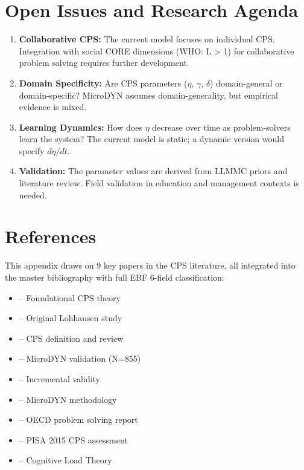 \section{Open Issues and Research Agenda}
\label{sec:cps-open}

\begin{enumerate}
\item \textbf{Collaborative CPS:} The current model focuses on individual CPS. Integration with social CORE dimensions (WHO: L > 1) for collaborative problem solving requires further development.

\item \textbf{Domain Specificity:} Are CPS parameters ($\eta$, $\gamma$, $\delta$) domain-general or domain-specific? MicroDYN assumes domain-generality, but empirical evidence is mixed.

\item \textbf{Learning Dynamics:} How does $\eta$ decrease over time as problem-solvers learn the system? The current model is static; a dynamic version would specify $d\eta/dt$.

\item \textbf{Validation:} The parameter values are derived from LLMMC priors and literature review. Field validation in education and management contexts is needed.
\end{enumerate}



\section{References}
\label{sec:cps-references}

This appendix draws on 9 key papers in the CPS literature, all integrated into the master bibliography with full EBF 6-field classification:

\begin{itemize}[nosep]
\item \cite{doerner1989logik} -- Foundational CPS theory
\item \cite{doerner1983lohhausen} -- Original Lohhausen study
\item \cite{funke2017cps} -- CPS definition and review
\item \cite{greiff2013cps} -- MicroDYN validation (N=855)
\item \cite{greiff2012microdynamvalidity} -- Incremental validity
\item \cite{greiff2017microdynamapproach} -- MicroDYN methodology
\item \cite{oecd2017problemsolving} -- OECD problem solving report
\item \cite{oecd2017pisa} -- PISA 2015 CPS assessment
\item \cite{sweller1988cognitiveload} -- Cognitive Load Theory
\end{itemize}

